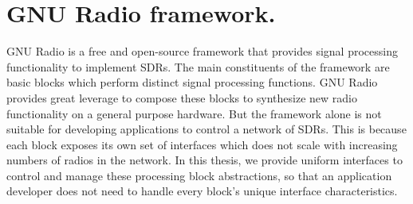 \section{GNU Radio framework.}
GNU Radio \cite{gnuradio} is a free and open-source framework that provides signal processing functionality to implement SDRs. The main constituents of the framework are basic blocks which perform distinct signal processing functions. GNU Radio provides great leverage to compose these blocks to synthesize new radio functionality on a general purpose hardware. But the framework alone is not suitable for developing applications to control a network of SDRs. This is because each block exposes its own set of interfaces which does not scale with increasing numbers of radios in the network. In this thesis, we provide uniform interfaces to control and manage these processing block abstractions, so that an application developer does not need to handle every block's unique interface characteristics.

